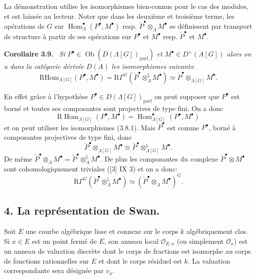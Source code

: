 \documentclass[11pt]{article}
\newenvironment{statement}[1]{\par\medskip\noindent\textbf{#1.}\ }{\par\medskip}
\DeclareMathOperator{\Hom}{Hom}
\newcommand{\R}{\mathrm{R}}\newcommand{\RHomCore}{\mathrm{RHom}}
\providecommand{\RHom}{\RHomCore}
\providecommand{\parf}{\mathrm{parf}}
\providecommand{\RHom}{\RHomCore}
\providecommand{\Hom}{\operatorname{Hom}}
\providecommand{\RHom}{\R\mathcal{H}om}
\providecommand{\R}{\mathrm R}
\providecommand{\parf}{\mathrm{parf}}
\providecommand{\RHom}{\RHomCore}
\providecommand{\Hom}{\operatorname{Hom}}
\begin{document}
La démonstration utilise les isomorphismes bien-connus pour le cas des modules, et est laissée au lecteur. Noter que dans les deuxième et troisième terme, les opérations de $G$ sur $\Hom_\Lambda^\bullet(P^\bullet,M^\bullet)$ resp. $\check P^\bullet\otimes_\Lambda M^\bullet$ se définissent par transport de structure à partir de ses opérations sur $P^\bullet$ et $M^\bullet$ resp. $\check P^\bullet$ et $M^\bullet$.

\begin{statement}{Corollaire 3.9}
\emph{Si} $P^\bullet\in \operatorname{Ob}(D(\Lambda[G])_{\parf})$ \emph{et} $M^\bullet\in D^+(A[G])$ \emph{alors on a dans la catégorie dérivée} $D(A)$ \emph{les isomorphismes suivants}:
\[
\RHom_{\Lambda[G]}(P^\bullet,M^\bullet)
=\R\Gamma^G(\check P^\bullet\otimes_\Lambda^{\mathbb{L}}M^\bullet)
\simeq \check P^\bullet\otimes_{\Lambda[G]}M^\bullet.
\tag{3.9.1}
\]
\end{statement}

En effet grâce à l'hypothèse $P^\bullet\in D(\Lambda[G])_{\parf}$ on peut supposer que $P^\bullet$ est borné et toutes ses composantes sont projectives de type 
fini. On a donc
\[
\mathrm{R}\Hom_{\Lambda[G]}(P^\bullet,M^\bullet)=\Hom_{\Lambda[G]}^\bullet(P^\bullet,M^\bullet)
\]
et on
peut utiliser les isomorphismes (3.8.1). Mais $\check P^\bullet$ est comme $P^\bullet$, borné à composantes projectives de type fini, donc
\[
\check P^\bullet\otimes_{\Lambda[G]}M^\bullet\cong \check P^\bullet\otimes_{\Lambda[G]}^{\mathbb{L}}M^\bullet.
\]
De même $\check P^\bullet\otimes_\Lambda M^\bullet=\check P^\bullet\otimes_\Lambda^{\mathbb{L}}M^\bullet$. De plus les composantes du complexe $\check P^\bullet\otimes M^\bullet$ sont cohomologiquement triviales ([3] IX 3) et on a donc:
\[
\mathrm{R}\Gamma^G(\check P^\bullet\otimes_\Lambda^{\mathbb{L}}M^\bullet)\simeq (\check P^\bullet\otimes_\Lambda M^\bullet)^G.
\]

\subsection*{4. La représentation de Swan.}

Soit $E$ une courbe algébrique lisse et connexe sur le corps $k$ algébriquement clos. Si $x\in E$ est un point fermé de $E$, son anneau local $\mathcal O_{E,x}$ (ou simplement $\mathcal O_x$) est un anneau de valuation discrète dont le corps de fractions est isomorphe au corps de fonctions rationnelles sur $E$ et dont le corps résiduel est $k$. La valuation correspondante sera désignée par $v_x$.
\end{document}
